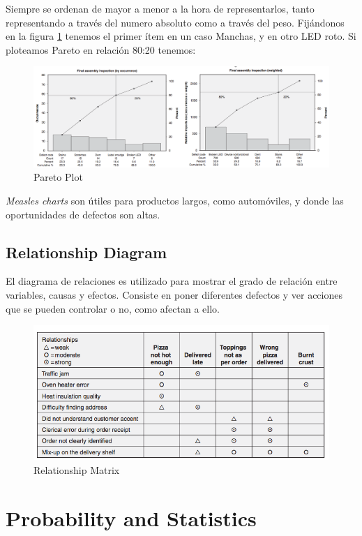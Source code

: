\documentclass[oneside]{book}
\begin{document}
Siempre se ordenan de mayor a menor a la hora de representarlos, tanto representando a través del numero absoluto como  a través del peso. Fijándonos en la figura \ref{fig:ParetoPlot} tenemos el primer ítem en un caso Manchas, y en otro LED roto. 
Si ploteamos Pareto en relación 80:20 tenemos:

\begin{figure}[ht!]
	\centering
	\includegraphics[width=180mm]{imagenes/ParetoPlot.png}
	\caption{Pareto Plot}
	\label{fig:ParetoPlot}
\end{figure}

\textit{Measles charts} son útiles para productos largos, como automóviles, y donde las oportunidades de defectos son altas.

\section{Relationship Diagram}

El diagrama de relaciones es utilizado para mostrar el grado de relación entre variables, causas y efectos. Consiste en poner diferentes defectos y ver acciones que se pueden controlar o no, como afectan a ello.

\begin{figure}[ht!]
	\centering
	\includegraphics[width=120mm]{imagenes/RelationshipMatrix.png}
	\caption{Relationship Matrix}
	\label{fig:RelationshipMatrix}
\end{figure}

\chapter{Probability and Statistics}
\end{document}
